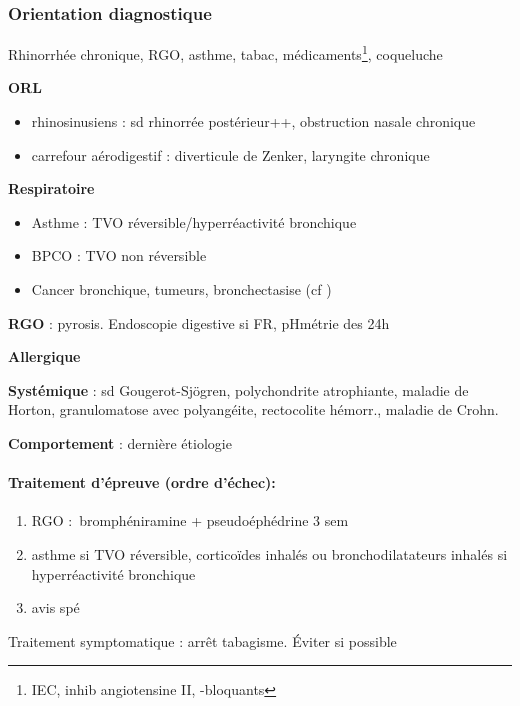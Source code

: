 \documentclass[11pt]{article}
\begin{document}
\subsubsection{Orientation diagnostique}
\label{sec:org39e0c38}
\label{subsec:toux_orientation}
\begin{tcolorbox}
Rhinorrhée chronique, RGO, asthme, tabac, médicaments\footnote{IEC, inhib angiotensine II, \beta{}-bloquants}, coqueluche
\end{tcolorbox}
\textbf{ORL}

\begin{itemize}
\item rhinosinusiens : sd rhinorrée postérieur++, obstruction nasale chronique
\item carrefour aérodigestif : diverticule de Zenker, laryngite chronique
\end{itemize}

\textbf{Respiratoire} 

\begin{itemize}
\item Asthme : TVO réversible/hyperréactivité bronchique
\item BPCO : TVO non réversible
\item Cancer bronchique, tumeurs, bronchectasise (cf
)
\end{itemize}


\textbf{RGO} : pyrosis. Endoscopie digestive si FR, pHmétrie des 24h

\textbf{Allergique} 

\textbf{Systémique} : sd Gougerot-Sjögren, polychondrite atrophiante, maladie
de Horton, granulomatose avec polyangéite, rectocolite hémorr., maladie de
Crohn.

\textbf{Comportement} : dernière étiologie

\paragraph{Traitement d'épreuve (ordre d'échec):}
\label{sec:org5afef3d}
\begin{enumerate}
\item RGO : bromphéniramine + pseudoéphédrine 3 sem
\item asthme si TVO réversible, corticoïdes inhalés ou bronchodilatateurs inhalés si
hyperréactivité bronchique
\item avis spé
\end{enumerate}

Traitement symptomatique : arrêt tabagisme. Éviter si possible
\end{document}
